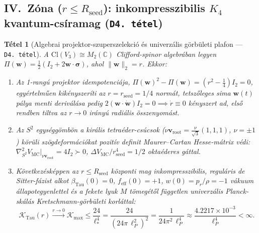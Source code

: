 \documentclass[11pt,a4paper]{article}
\newtheorem{theorem}{T\'etel}[section]
\theoremstyle{remark}
\begin{document}
\subsection{IV.\ Z\'ona (\texorpdfstring{$r \le R_{\mathrm{seed}}$}{r <= R\_seed}): inkompresszibilis \texorpdfstring{$K_4$}{K4} kvantum-cs\'iramag (\texttt{D4.\ t\'etel})}

\begin{theorem}[Algebrai projektor-szuperszelekci\'o \'es univerz\'alis g\"orb\"uleti plafon --- \texttt{D4.\ t\'etel}]
\label{thm:d4}
A $\mathrm{Cl}(V_3) \cong M_2(\mathbb{C})$ Clifford-spinor algebr\'aban legyen $\Pi(\mathbf{w}) = \frac{1}{2}(I_2 + 2\mathbf{w}\cdot\boldsymbol{\sigma})$, ahol $\|\mathbf{w}\|_2 = r$. Ekkor:
\begin{enumerate}
  \item Az 1-rang\'u projektor idempotenci\'aja, $\Pi(\mathbf{w})^2 - \Pi(\mathbf{w}) = (r^2 - \frac{1}{4})I_2 = 0$, egy\'ertelm\H{u}en kik\'enyszer\'iti az $r = r_{\mathrm{seed}} = 1/4$ norm\'at, tetsz\H{o}leges sima $\mathbf{w}(t)$ p\'alya menti deriv\'al\'asa pedig $2(\mathbf{w}\cdot\dot{\mathbf{w}})I_2 = 0 \implies \dot{r} \equiv 0$ k\'enyszert ad, els\H{o} rendben tiltva az $r \to 0$ ir\'any\'u radi\'alis \"osszenyom\'ast.
  \item Az $S^2$ egys\'egg\"omb\"on a kir\'alis tetra\'eder-cs\'ucsok ($\nu\mathbf{v}_{\mathrm{root}} = \frac{\nu}{\sqrt{3}}(1,1,1)$, $\nu = \pm 1$) k\"or\"uli sz\"ogdeform\'aci\'okat pozit\'iv definit Maurer--Cartan Hesse-m\'atrix v\'edi: $\nabla^2_{S^2} V_{\mathrm{MC}}\big|_{\nu\mathbf{v}_{\mathrm{root}}} = 4I_2 \succ 0$, $\Delta V_{\mathrm{MC}}/r_{\mathrm{seed}}^4 = 1/2$ okta\'ederes g\'attal.
  \item K\"ovetkez\'esk\'eppen az $r \le R_{\mathrm{seed}}$ k\"ozponti mag inkompresszibilis, regul\'aris de Sitter-f\'azist alkot $\beta_{\mathrm{Tau}}(0) = 0$, $f_{\mathrm{eff}}(0) = +1$, $w(0) = p_r/\rho = -1$ v\'akuum \'allapotegyenlettel \'es a fekete lyuk $M$ t\"omeg\'et\H{o}l f\"uggetlen univerz\'alis Planck-sk\'al\'as Kretschmann-g\"orb\"uleti korl\'attal:
  \begin{equation}
    \mathcal{K}_{\mathrm{Tau}}(r) \xrightarrow{r \to 0} \mathcal{K}_{\max} \le \frac{24}{\ell_*^4} = \frac{24}{(24\pi\,\ell_P^2)^2} = \frac{1}{24\pi^2\,\ell_P^4} \approx \frac{4.2217 \times 10^{-3}}{\ell_P^4} < \infty.
    \label{eq:kretschmann_bound}
  \end{equation}
\end{enumerate}
\end{theorem}
\end{document}
